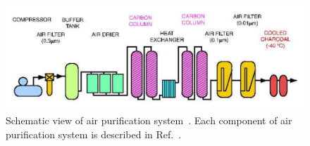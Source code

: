 \begin{figure}[H]
	\centering
	\includegraphics[width=12cm]{Figures/SK/Air}
	\caption[Schematic view of air purification system]{
	Schematic view of air purification system~\cite{2003Fukuda}.
	Each component of air purification system is described in Ref.~\cite{2015NakanoPhD}.
	}\label{SK_Air}
\end{figure}





